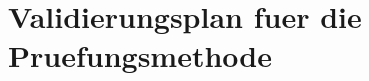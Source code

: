 \documentclass[11pt, a4paper]{article}
\begin{document}
\section{Validierungsplan fuer die Pruefungsmethode}
\end{document}

